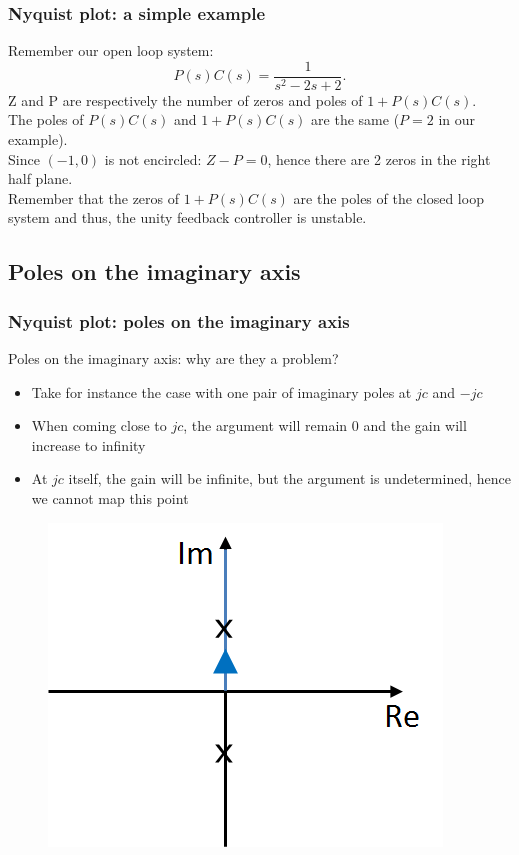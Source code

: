 \begin{frame}
	\frametitle{Nyquist plot: a simple example}
	Remember our open loop system: $$P(s)C(s)=\frac{1}{s^2-2s+2}.$$
	Z and P are respectively the number of zeros and poles of $1+P(s)C(s)$.\\
	The poles of $P(s)C(s)$ and $1+P(s)C(s)$ are the same ($P=2$ in our example).\\
	Since $(-1,0)$ is not encircled: $Z-P=0$, hence there are 2 zeros in the right half plane.\\
	Remember that the zeros of $1+P(s)C(s)$ are the poles of the closed loop system and thus, the unity feedback controller is unstable.
\end{frame}

\subsection{Poles on the imaginary axis}

\begin{frame}
	\frametitle{Nyquist plot: poles on the imaginary axis}
	Poles on the imaginary axis: why are they a problem?
	\begin{itemize}
		\item Take for instance the case with one pair of imaginary poles at $jc$ and $-jc$
		\item When coming close to $jc$, the argument will remain 0 and the gain will increase to infinity
		\item At $jc$ itself, the gain will be infinite, but the argument is undetermined, hence we cannot map this point
	\end{itemize}
	\begin{figure}
		\includegraphics[width=0.35\linewidth]{imaginary_axis}
	\end{figure}
\end{frame}

